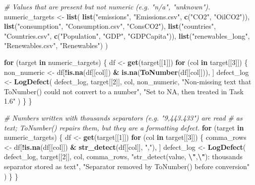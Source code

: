 \documentclass[
]{article}
\newenvironment{Shaded}{\begin{snugshade}}{\end{snugshade}}
\newcommand{\CommentTok}[1]{\textcolor[rgb]{0.56,0.35,0.01}{\textit{#1}}}
\newcommand{\ControlFlowTok}[1]{\textcolor[rgb]{0.13,0.29,0.53}{\textbf{#1}}}
\newcommand{\DecValTok}[1]{\textcolor[rgb]{0.00,0.00,0.81}{#1}}
\newcommand{\FunctionTok}[1]{\textcolor[rgb]{0.13,0.29,0.53}{\textbf{#1}}}
\newcommand{\NormalTok}[1]{#1}
\newcommand{\OtherTok}[1]{\textcolor[rgb]{0.56,0.35,0.01}{#1}}
\newcommand{\SpecialCharTok}[1]{\textcolor[rgb]{0.81,0.36,0.00}{\textbf{#1}}}
\newcommand{\StringTok}[1]{\textcolor[rgb]{0.31,0.60,0.02}{#1}}
\begin{document}
\begin{Shaded}
\begin{Highlighting}[]
\CommentTok{\# Values that are present but not numeric (e.g. "n/a", "unknown").}
\NormalTok{numeric\_targets }\OtherTok{\textless{}{-}} \FunctionTok{list}\NormalTok{(}
  \FunctionTok{list}\NormalTok{(}\StringTok{"emissions"}\NormalTok{, }\StringTok{"Emissions.csv"}\NormalTok{, }\FunctionTok{c}\NormalTok{(}\StringTok{"CO2"}\NormalTok{, }\StringTok{"OilCO2"}\NormalTok{)),}
  \FunctionTok{list}\NormalTok{(}\StringTok{"consumption"}\NormalTok{, }\StringTok{"Consumption.csv"}\NormalTok{, }\StringTok{"ConsCO2"}\NormalTok{),}
  \FunctionTok{list}\NormalTok{(}\StringTok{"countries"}\NormalTok{, }\StringTok{"Countries.csv"}\NormalTok{, }\FunctionTok{c}\NormalTok{(}\StringTok{"Population"}\NormalTok{, }\StringTok{"GDP"}\NormalTok{, }\StringTok{"GDPCapita"}\NormalTok{)),}
  \FunctionTok{list}\NormalTok{(}\StringTok{"renewables\_long"}\NormalTok{, }\StringTok{"Renewables.csv"}\NormalTok{, }\StringTok{"Renewables"}\NormalTok{)}
\NormalTok{)}

\ControlFlowTok{for}\NormalTok{ (target }\ControlFlowTok{in}\NormalTok{ numeric\_targets) \{}
\NormalTok{  df }\OtherTok{\textless{}{-}} \FunctionTok{get}\NormalTok{(target[[}\DecValTok{1}\NormalTok{]])}
  \ControlFlowTok{for}\NormalTok{ (col }\ControlFlowTok{in}\NormalTok{ target[[}\DecValTok{3}\NormalTok{]]) \{}
\NormalTok{    non\_numeric }\OtherTok{\textless{}{-}}\NormalTok{ df[}\SpecialCharTok{!}\FunctionTok{is.na}\NormalTok{(df[[col]]) }\SpecialCharTok{\&} \FunctionTok{is.na}\NormalTok{(}\FunctionTok{ToNumber}\NormalTok{(df[[col]])), ]}
\NormalTok{    defect\_log }\OtherTok{\textless{}{-}} \FunctionTok{LogDefect}\NormalTok{(}
\NormalTok{      defect\_log, target[[}\DecValTok{2}\NormalTok{]], col, non\_numeric,}
      \StringTok{"Non{-}missing text that ToNumber() could not convert to a number"}\NormalTok{,}
      \StringTok{"Set to NA, then treated in Task 1.6"}
\NormalTok{    )}
\NormalTok{  \}}
\NormalTok{\}}

\CommentTok{\# Numbers written with thousands separators (e.g. "9,443.433") are read}
\CommentTok{\# as text; ToNumber() repairs them, but they are a formatting defect.}
\ControlFlowTok{for}\NormalTok{ (target }\ControlFlowTok{in}\NormalTok{ numeric\_targets) \{}
\NormalTok{  df }\OtherTok{\textless{}{-}} \FunctionTok{get}\NormalTok{(target[[}\DecValTok{1}\NormalTok{]])}
  \ControlFlowTok{for}\NormalTok{ (col }\ControlFlowTok{in}\NormalTok{ target[[}\DecValTok{3}\NormalTok{]]) \{}
\NormalTok{    comma\_rows }\OtherTok{\textless{}{-}}\NormalTok{ df[}\SpecialCharTok{!}\FunctionTok{is.na}\NormalTok{(df[[col]]) }\SpecialCharTok{\&} \FunctionTok{str\_detect}\NormalTok{(df[[col]], }\StringTok{","}\NormalTok{), ]}
\NormalTok{    defect\_log }\OtherTok{\textless{}{-}} \FunctionTok{LogDefect}\NormalTok{(}
\NormalTok{      defect\_log, target[[}\DecValTok{2}\NormalTok{]], col, comma\_rows,}
      \StringTok{"str\_detect(value, }\SpecialCharTok{\textbackslash{}"}\StringTok{,}\SpecialCharTok{\textbackslash{}"}\StringTok{): thousands separator stored as text"}\NormalTok{,}
      \StringTok{"Separator removed by ToNumber() before conversion"}
\NormalTok{    )}
\NormalTok{  \}}
\NormalTok{\}}


\end{Highlighting}
\end{Shaded}
\end{document}
